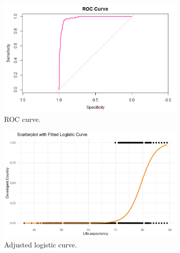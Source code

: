 \documentclass[12pt]{article}
\begin{document}
\begin{figure}[h]
    \centering
    \includegraphics[width=0.8\textwidth]{images/figure_2.png}
    \caption{ROC curve.}
    \label{fig:figure_2}
\end{figure}


\begin{figure}[h]
    \centering
    \includegraphics[width=0.8\textwidth]{images/figure_3.png}
    \caption{Adjusted logistic curve.}
    \label{fig:figure_3}
\end{figure}
\end{document}
